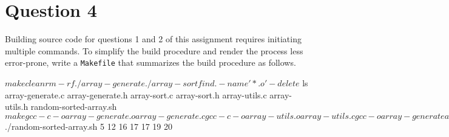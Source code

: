 
\section*{Question 4}

Building source code for questions 1 and 2 of this assignment requires initiating multiple commands.
To simplify the build procedure and render the process less error-prone, write a \texttt{Makefile} that summarizes the build procedure as follows.

\begin{terminal}
$ make clean
rm -rf ./array-generate ./array-sort
find . -name '*.o' -delete
$ ls
array-generate.c array-generate.h array-sort.c array-sort.h
array-utils.c array-utils.h random-sorted-array.sh
$ make
gcc -c -o array-generate.o array-generate.c
gcc -c -o array-utils.o array-utils.c
gcc -o array-generate array-generate.o array-utils.o -Werror -Wall -std=gnu99 -I.
gcc -c -o array-sort.o array-sort.c
gcc -o array-sort array-sort.o array-utils.o -Werror -Wall -std=gnu99 -I.
$ ./random-sorted-array.sh
5 12 16 17 17 19 20
\end{terminal}
